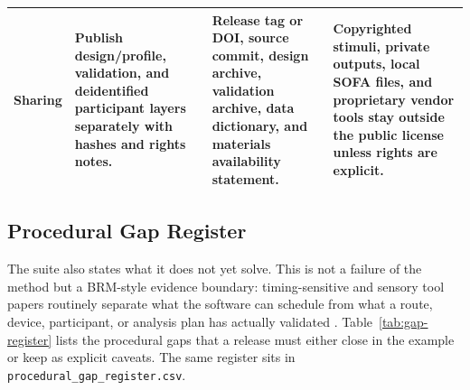 \documentclass[pdflatex,sn-apa]{sn-jnl}
\newcommand{\code}[1]{\texttt{#1}}
\begin{document}
\begin{table}[t]
\begin{tabularx}{\textwidth}{>{\raggedright\arraybackslash}p{} >{\raggedright\arraybackslash}X >{\raggedright\arraybackslash}p{} >{\raggedright\arraybackslash}p{}}
Sharing & Publish design/profile, validation, and deidentified participant layers separately with hashes and rights notes. & Release tag or DOI, source commit, design archive, validation archive, data dictionary, and materials availability statement. & Copyrighted stimuli, private outputs, local SOFA files, and proprietary vendor tools stay outside the public license unless rights are explicit. \\
\bottomrule
\end{tabularx}
\end{table}

\subsection{Procedural Gap Register}

The suite also states what it does not yet solve. This is not a failure of the method but a BRM-style evidence boundary: timing-sensitive and sensory tool papers routinely separate what the software can schedule from what a route, device, participant, or analysis plan has actually validated \citep{Bridges2020,Reimers2016,Garaizar2019,Hirst2026}. Table~\ref{tab:gap-register} lists the procedural gaps that a release must either close in the example or keep as explicit caveats. The same register sits in \code{procedural\_gap\_register.csv}.
\end{document}
